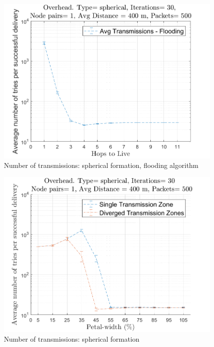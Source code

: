 \begin{figure}[hbtp]
\centering
\includegraphics[width=\simResultFigSize\textwidth,height=\textheight,keepaspectratio]{ncsuthesis-0.6/Chapter-5/figs/fl_trans_spherical.png}
\caption{Number of transmissions: spherical formation, flooding algorithm}
\label{fig:fl_trans_spherical}
\end{figure}

\begin{figure}[hbtp]
\centering
\includegraphics[width=\simResultFigSize\textwidth,height=\textheight,keepaspectratio]{ncsuthesis-0.6/Chapter-5/figs/pe_trans_spherical.png}
\caption{Number of transmissions: spherical formation}
\label{fig:pe_trans_spherical}
\end{figure}

